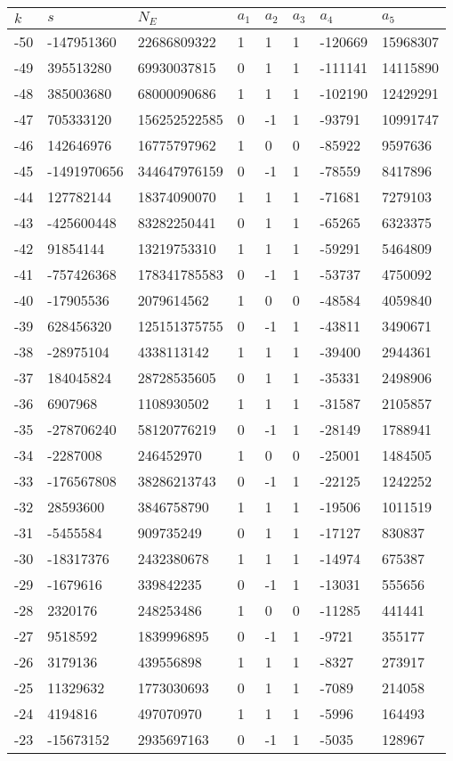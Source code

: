 \documentclass{amsart}
\begin{document}
\begin{longtable}{|l|l|l|lllll|}
\hline
$k$ & $s$ & $N_E$ & $a_1$ & $a_2$ & $a_3$ & $a_4$ & $a_5$\\
\hline
-50&-147951360&22686809322&1&1&1&-120669&15968307\\
-49&395513280&69930037815&0&1&1&-111141&14115890\\
-48&385003680&68000090686&1&1&1&-102190&12429291\\
-47&705333120&156252522585&0&-1&1&-93791&10991747\\
-46&142646976&16775797962&1&0&0&-85922&9597636\\
-45&-1491970656&344647976159&0&-1&1&-78559&8417896\\
-44&127782144&18374090070&1&1&1&-71681&7279103\\
-43&-425600448&83282250441&0&1&1&-65265&6323375\\
-42&91854144&13219753310&1&1&1&-59291&5464809\\
-41&-757426368&178341785583&0&-1&1&-53737&4750092\\
-40&-17905536&2079614562&1&0&0&-48584&4059840\\
-39&628456320&125151375755&0&-1&1&-43811&3490671\\
-38&-28975104&4338113142&1&1&1&-39400&2944361\\
-37&184045824&28728535605&0&1&1&-35331&2498906\\
-36&6907968&1108930502&1&1&1&-31587&2105857\\
-35&-278706240&58120776219&0&-1&1&-28149&1788941\\
-34&-2287008&246452970&1&0&0&-25001&1484505\\
-33&-176567808&38286213743&0&-1&1&-22125&1242252\\
-32&28593600&3846758790&1&1&1&-19506&1011519\\
-31&-5455584&909735249&0&1&1&-17127&830837\\
-30&-18317376&2432380678&1&1&1&-14974&675387\\
-29&-1679616&339842235&0&-1&1&-13031&555656\\
-28&2320176&248253486&1&0&0&-11285&441441\\
-27&9518592&1839996895&0&-1&1&-9721&355177\\
-26&3179136&439556898&1&1&1&-8327&273917\\
-25&11329632&1773030693&0&1&1&-7089&214058\\
-24&4194816&497070970&1&1&1&-5996&164493\\
-23&-15673152&2935697163&0&-1&1&-5035&128967\\

\end{longtable}
\end{document}
